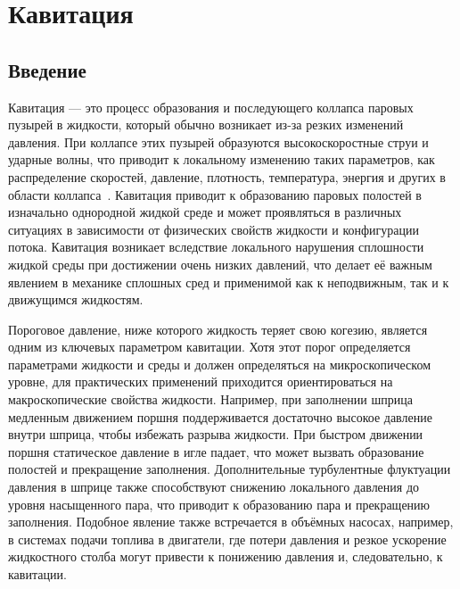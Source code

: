 \newpage
\titleformat{\section}[block] %
{\bfseries\normalsize}{\thesection}{1em}{}
\titlespacing\section{\parindent}{\parskip}{\parskip} 

\section{Кавитация}
\subsection{Введение}
\vspace{0.5\baselineskip}

Кавитация — это процесс образования и последующего коллапса паровых пузырей в жидкости, который обычно возникает из-за резких изменений давления.
При коллапсе этих пузырей образуются высокоскоростные струи и ударные волны, что приводит к локальному изменению таких параметров, как распределение скоростей, давление, плотность, температура, энергия и других в области коллапса~\cite{10.2478/s11534-009-0092-y}.
Кавитация приводит к образованию паровых полостей в изначально однородной жидкой среде и может проявляться в различных ситуациях в зависимости от физических свойств жидкости и конфигурации потока.
Кавитация возникает вследствие локального нарушения сплошности жидкой среды при достижении очень низких давлений, что делает её важным явлением в механике сплошных сред и применимой как к неподвижным, так и к движущимся жидкостям.

Пороговое давление, ниже которого жидкость теряет свою когезию, является одним из ключевых параметром кавитации.
Хотя этот порог определяется параметрами жидкости и среды и должен определяться на микроскопическом уровне, для практических применений приходится ориентироваться на макроскопические свойства жидкости.
Например, при заполнении шприца медленным движением поршня поддерживается достаточно высокое давление внутри шприца, чтобы избежать разрыва жидкости.
При быстром движении поршня статическое давление в игле падает, что может вызвать образование полостей и прекращение заполнения. 
Дополнительные турбулентные флуктуации давления в шприце также способствуют снижению локального давления до уровня насыщенного пара, что приводит к образованию пара и прекращению заполнения.
Подобное явление также встречается в объёмных насосах, например, в системах подачи топлива в двигатели, где потери давления и резкое ускорение жидкостного столба могут привести к понижению давления и, следовательно, к кавитации.

